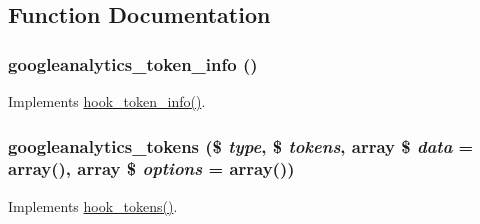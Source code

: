 \subsection{Function Documentation}
\hypertarget{googleanalytics_8tokens_8inc_a41f3ed09246b0dd2e51f1e41d604af24}{
\subsubsection[{googleanalytics\_\-token\_\-info}]{\setlength{\rightskip}{0pt plus 5cm}googleanalytics\_\-token\_\-info ()}}
\label{googleanalytics_8tokens_8inc_a41f3ed09246b0dd2e51f1e41d604af24}
Implements \hyperlink{group__hooks_gab868597197cf36911f95dcd29ae0b954}{hook\_\-token\_\-info()}. \hypertarget{googleanalytics_8tokens_8inc_a7ab13afdbf75bfe40bce385f6cfeed87}{
\subsubsection[{googleanalytics\_\-tokens}]{\setlength{\rightskip}{0pt plus 5cm}googleanalytics\_\-tokens (\$ {\em type}, \/  \$ {\em tokens}, \/  array \$ {\em data} = {\ttfamily array()}, \/  array \$ {\em options} = {\ttfamily array()})}}
\label{googleanalytics_8tokens_8inc_a7ab13afdbf75bfe40bce385f6cfeed87}
Implements \hyperlink{group__hooks_ga3bfd87d9a19b2397b0f970e1cff7ea4f}{hook\_\-tokens()}. 